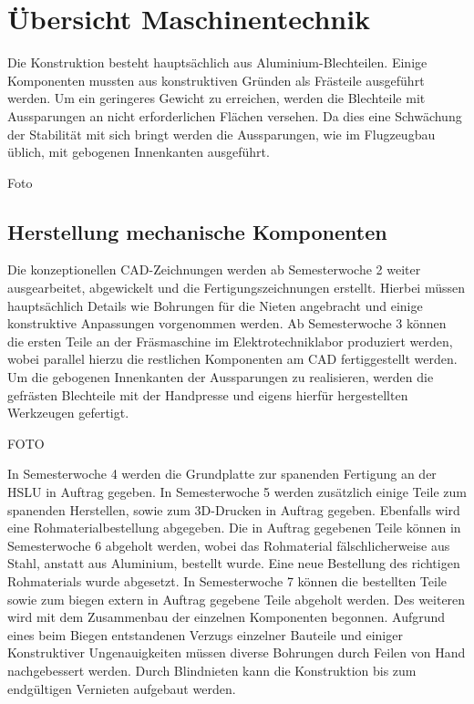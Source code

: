 \section{Übersicht Maschinentechnik}
Die Konstruktion besteht hauptsächlich aus Aluminium-Blechteilen. Einige 
Komponenten mussten aus konstruktiven Gründen als Frästeile ausgeführt werden.
Um ein geringeres Gewicht zu 
erreichen, werden die Blechteile mit Aussparungen an nicht erforderlichen 
Flächen versehen. Da dies eine Schwächung der Stabilität mit sich bringt werden die Aussparungen, wie im Flugzeugbau üblich, mit gebogenen Innenkanten ausgeführt. 

Foto



\subsection{Herstellung mechanische Komponenten}
Die konzeptionellen CAD-Zeichnungen werden ab Semesterwoche 2 weiter 
ausgearbeitet, abgewickelt und die Fertigungszeichnungen erstellt. Hierbei 
müssen hauptsächlich Details wie Bohrungen für die Nieten angebracht und 
einige konstruktive Anpassungen vorgenommen werden. 
Ab Semesterwoche 3 können die ersten Teile an der Fräsmaschine im Elektrotechniklabor produziert werden, 
wobei parallel  hierzu die restlichen Komponenten am CAD fertiggestellt werden.
Um die gebogenen Innenkanten der Aussparungen zu realisieren, werden die gefrästen Blechteile mit der Handpresse und eigens hierfür hergestellten Werkzeugen gefertigt.

FOTO

In Semesterwoche 4 werden die Grundplatte zur spanenden Fertigung an der HSLU 
in Auftrag gegeben.
In Semesterwoche 5 werden zusätzlich einige Teile zum spanenden Herstellen, 
sowie zum 3D-Drucken in Auftrag gegeben. Ebenfalls wird eine 
Rohmaterialbestellung abgegeben.
Die in Auftrag gegebenen Teile können in Semesterwoche 6 abgeholt werden, 
wobei das  Rohmaterial fälschlicherweise aus Stahl, anstatt aus Aluminium, 
bestellt wurde. Eine neue Bestellung des richtigen Rohmaterials wurde abgesetzt.
In Semesterwoche 7 können die bestellten Teile sowie zum biegen extern in Auftrag gegebene Teile abgeholt werden. Des weiteren wird mit dem Zusammenbau der einzelnen Komponenten begonnen. Aufgrund eines beim Biegen entstandenen Verzugs einzelner Bauteile und einiger Konstruktiver Ungenauigkeiten müssen diverse Bohrungen durch Feilen von Hand nachgebessert werden. Durch Blindnieten kann die Konstruktion bis zum endgültigen Vernieten aufgebaut werden.